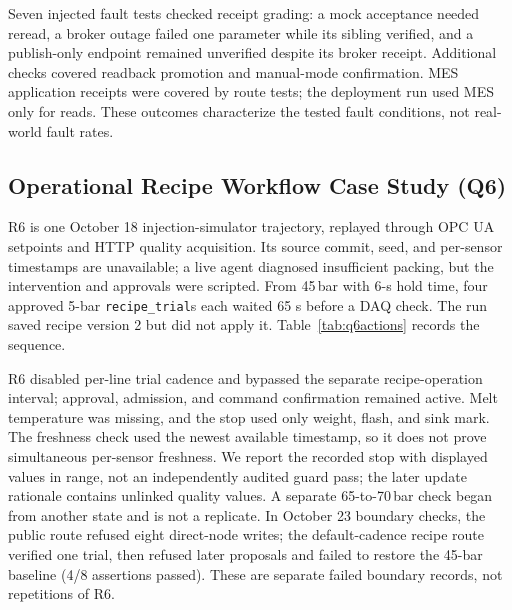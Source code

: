 Seven injected fault tests checked receipt grading: a mock acceptance needed
reread, a broker outage failed one parameter while its sibling verified, and
a publish-only endpoint remained unverified despite its broker receipt.
Additional checks covered readback promotion and manual-mode confirmation.
MES application receipts were covered by route tests; the deployment run used
MES only for reads. These outcomes characterize the tested fault conditions,
not real-world fault rates.

\subsection{Operational Recipe Workflow Case Study (Q6)}
\label{sec:recipeexperiment}
R6 is one October 18 injection-simulator trajectory, replayed through OPC UA
setpoints and HTTP quality acquisition. Its source commit, seed, and
per-sensor timestamps are unavailable; a live agent diagnosed insufficient
packing, but the intervention and approvals were scripted. From 45\,bar with
6-s hold time, four approved 5-bar \texttt{recipe\_trial}s each waited 65 s
before a DAQ check. The run saved recipe version 2 but did not apply it.
Table~\ref{tab:q6actions} records the sequence.



R6 disabled per-line trial cadence and bypassed the separate recipe-operation
interval; approval, admission, and command confirmation remained active.
Melt temperature was missing, and the stop used only weight, flash, and sink
mark. The freshness check used the newest available timestamp, so it does not
prove simultaneous per-sensor freshness. We report the recorded stop with
displayed values in range, not an independently audited guard pass; the later
update rationale contains unlinked quality values. A separate 65-to-70\,bar
check began from another state and is not a replicate. In October 23 boundary
checks, the public route refused eight direct-node writes; the default-cadence
recipe route verified one trial, then refused later proposals and failed to
restore the 45-bar baseline (4/8 assertions passed). These are separate
failed boundary records, not repetitions of R6.
